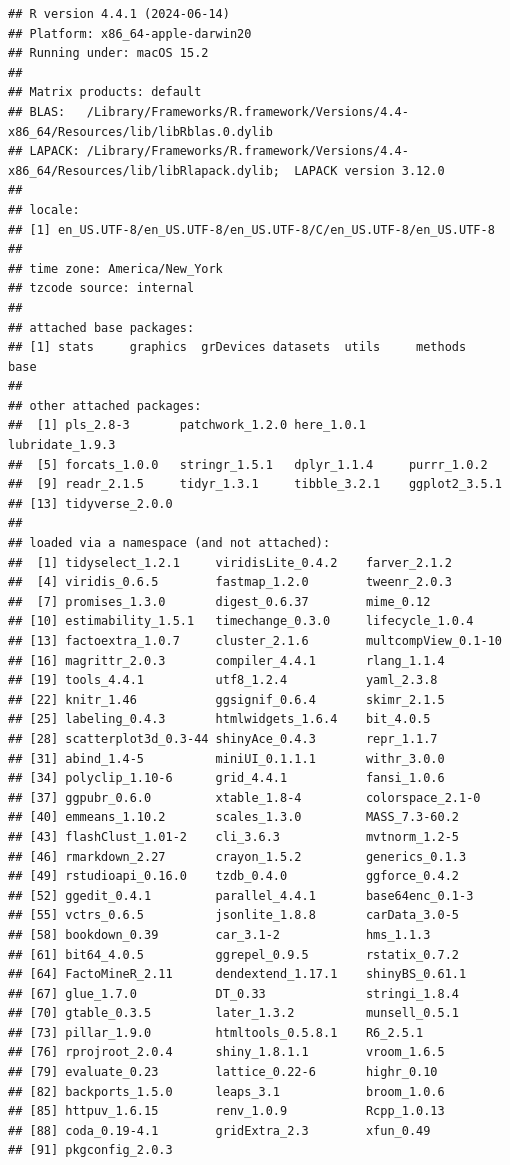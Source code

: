 \documentclass[
]{book}
\begin{document}
\begin{verbatim}
## R version 4.4.1 (2024-06-14)
## Platform: x86_64-apple-darwin20
## Running under: macOS 15.2
## 
## Matrix products: default
## BLAS:   /Library/Frameworks/R.framework/Versions/4.4-x86_64/Resources/lib/libRblas.0.dylib 
## LAPACK: /Library/Frameworks/R.framework/Versions/4.4-x86_64/Resources/lib/libRlapack.dylib;  LAPACK version 3.12.0
## 
## locale:
## [1] en_US.UTF-8/en_US.UTF-8/en_US.UTF-8/C/en_US.UTF-8/en_US.UTF-8
## 
## time zone: America/New_York
## tzcode source: internal
## 
## attached base packages:
## [1] stats     graphics  grDevices datasets  utils     methods   base     
## 
## other attached packages:
##  [1] pls_2.8-3       patchwork_1.2.0 here_1.0.1      lubridate_1.9.3
##  [5] forcats_1.0.0   stringr_1.5.1   dplyr_1.1.4     purrr_1.0.2    
##  [9] readr_2.1.5     tidyr_1.3.1     tibble_3.2.1    ggplot2_3.5.1  
## [13] tidyverse_2.0.0
## 
## loaded via a namespace (and not attached):
##  [1] tidyselect_1.2.1     viridisLite_0.4.2    farver_2.1.2        
##  [4] viridis_0.6.5        fastmap_1.2.0        tweenr_2.0.3        
##  [7] promises_1.3.0       digest_0.6.37        mime_0.12           
## [10] estimability_1.5.1   timechange_0.3.0     lifecycle_1.0.4     
## [13] factoextra_1.0.7     cluster_2.1.6        multcompView_0.1-10 
## [16] magrittr_2.0.3       compiler_4.4.1       rlang_1.1.4         
## [19] tools_4.4.1          utf8_1.2.4           yaml_2.3.8          
## [22] knitr_1.46           ggsignif_0.6.4       skimr_2.1.5         
## [25] labeling_0.4.3       htmlwidgets_1.6.4    bit_4.0.5           
## [28] scatterplot3d_0.3-44 shinyAce_0.4.3       repr_1.1.7          
## [31] abind_1.4-5          miniUI_0.1.1.1       withr_3.0.0         
## [34] polyclip_1.10-6      grid_4.4.1           fansi_1.0.6         
## [37] ggpubr_0.6.0         xtable_1.8-4         colorspace_2.1-0    
## [40] emmeans_1.10.2       scales_1.3.0         MASS_7.3-60.2       
## [43] flashClust_1.01-2    cli_3.6.3            mvtnorm_1.2-5       
## [46] rmarkdown_2.27       crayon_1.5.2         generics_0.1.3      
## [49] rstudioapi_0.16.0    tzdb_0.4.0           ggforce_0.4.2       
## [52] ggedit_0.4.1         parallel_4.4.1       base64enc_0.1-3     
## [55] vctrs_0.6.5          jsonlite_1.8.8       carData_3.0-5       
## [58] bookdown_0.39        car_3.1-2            hms_1.1.3           
## [61] bit64_4.0.5          ggrepel_0.9.5        rstatix_0.7.2       
## [64] FactoMineR_2.11      dendextend_1.17.1    shinyBS_0.61.1      
## [67] glue_1.7.0           DT_0.33              stringi_1.8.4       
## [70] gtable_0.3.5         later_1.3.2          munsell_0.5.1       
## [73] pillar_1.9.0         htmltools_0.5.8.1    R6_2.5.1            
## [76] rprojroot_2.0.4      shiny_1.8.1.1        vroom_1.6.5         
## [79] evaluate_0.23        lattice_0.22-6       highr_0.10          
## [82] backports_1.5.0      leaps_3.1            broom_1.0.6         
## [85] httpuv_1.6.15        renv_1.0.9           Rcpp_1.0.13         
## [88] coda_0.19-4.1        gridExtra_2.3        xfun_0.49           
## [91] pkgconfig_2.0.3
\end{verbatim}
\end{document}
